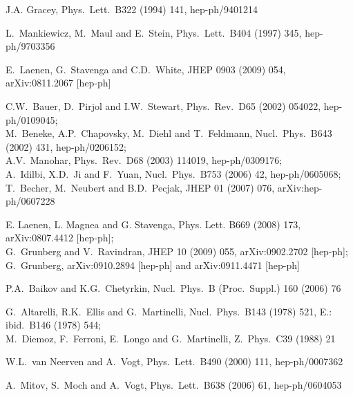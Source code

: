 \documentclass[12pt]{article}
\begin{document}
{\begin{thebibliography}{10}
J.A. Gracey,
  Phys.\ Lett.\ B322 (1994) 141, hep-ph/9401214

L.~Mankiewicz, M.~Maul and E.~Stein,
  Phys.\ Lett.\  B404 (1997) 345, hep-ph/9703356

E.~Laenen, G.~Stavenga and C.D.~White, 
  JHEP 0903 (2009) 054, arXiv:0811.2067 [hep-ph]

C.W.~Bauer, D.~Pirjol and I.W.~Stewart,
  Phys.\ Rev.\  D65 (2002) 054022, hep-ph/0109045; \\
M.~Beneke, A.P.~Chapovsky, M.~Diehl and T.~Feldmann,
  Nucl.\ Phys.\  B643 (2002) 431, hep-ph/0206152; \\
A.V.~Manohar,
  Phys.\ Rev.\  D68 (2003) 114019, hep-ph/0309176; \\
A.~Idilbi, X.D.~Ji and F.~Yuan,
  Nucl.\ Phys.\  B753 (2006) 42, hep-ph/0605068; \\
T.~Becher, M.~Neubert and B.D.~Pecjak,
  JHEP 01 (2007) 076, arXiv:hep-ph/0607228

E. Laenen, L. Magnea and G. Stavenga,
  Phys. Lett.  B669 (2008) 173, arXiv:0807.4412 [hep-ph]; \\
G.~Grunberg and V.~Ravindran,
  JHEP 10 (2009) 055, arXiv:0902.2702 [hep-ph]; \\
G.~Grunberg, arXiv:0910.2894 [hep-ph] and arXiv:0911.4471 [hep-ph]

P.A.~Baikov and K.G.~Chetyrkin,
  Nucl.~Phys.~B (Proc.~Suppl.) 160 (2006) 76

G.~Altarelli, R.K.~Ellis and G.~Martinelli,
  Nucl.\ Phys.\ B143 (1978) 521, E.: ibid.~B146 (1978) 544; \\ 
M.~Diemoz, F.~Ferroni, E.~Longo and G.~Martinelli,
  Z.\ Phys.\ C39 (1988) 21

W.L.~van Neerven and A.~Vogt,
  Phys.\ Lett.\  B490 (2000) 111, hep-ph/0007362

A.~Mitov, S.~Moch and A.~Vogt,
  Phys.\ Lett.\  B638 (2006) 61, hep-ph/0604053

\end{thebibliography}
}
\end{document}
